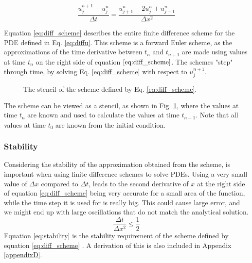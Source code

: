 \begin{equation}
    \label{eq:diff_scheme}
    \frac{u_j^{n+1}-u_j^n}{\Delta t} = \frac{u_{j+1}^n - 2u_j^n + u_{j-1}^n}{\Delta x^2}
\end{equation}

Equation \ref{eq:diff_scheme} describes the entire finite difference scheme for the PDE defined in Eq. \ref{eq:diffu}.
This scheme is a forward Euler scheme, as the approximations of the time derivative between $t_n$ and $t_{n+1}$ are made using values at time $t_n$ on the right side of equation $\ref{eq:diff_scheme}$.
The schemes "step" through time, by solving Eq. \ref{eq:diff_scheme} with respect to $u_j^{n+1}$.
\begin{figure}[h]
        \centering
        
        \caption{The stencil of the scheme defined by Eq. \ref{eq:diff_scheme}.} 
        \label{fig:fd_stencil}  
    \end{figure}
The scheme can be viewed as a stencil, as shown in Fig. \ref{fig:fd_stencil}, where the values at time $t_n$ are known and used to calculate the values at time $t_{n+1}$.
Note that all values at time $t_0$ are known from the initial condition.
\subsubsection{Stability}
Considering the stability of the approximation obtained from the scheme, is important when using finite difference schemes to solve PDEs.
Using a very small value of $\Delta x$ compared to $\Delta t$, leads to the second derivative of $x$ at the right side of equation \eqref{eq:diff_scheme} being very accurate for a small area of the function, while the time step it is used for is really big.
This could cause large error, and we might end up with large oscillations that do not match the analytical solution.
\begin{equation}
    \label{eq:stability}
    \frac{\Delta t}{\Delta x^2} \leq \frac{1}{2}
\end{equation}
Equation \eqref{eq:stability} is the stability requirement of the scheme defined by equation \eqref{eq:diff_scheme} \citep[p. 130]{tveitoPDE}.
A derivation of this is also included in Appendix \ref{appendixD}.

